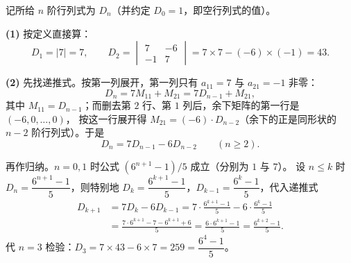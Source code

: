 
\begin{solution}
记所给 $n$ 阶行列式为 $D_n$（并约定 $D_0=1$，即空行列式的值）。

\textbf{(1)} 按定义直接算：
\[
D_1=|7|=7,\qquad
D_2=\begin{vmatrix}7&-6\\-1&7\end{vmatrix}=7\times7-(-6)\times(-1)=43 .
\]

\textbf{(2)} 先找递推式。按第一列展开，第一列只有 $a_{11}=7$ 与 $a_{21}=-1$ 非零：
\[
D_n=7M_{11}+M_{21}=7D_{n-1}+M_{21},
\]
其中 $M_{11}=D_{n-1}$；而删去第 $2$ 行、第 $1$ 列后，余下矩阵的第一行是 $(-6,0,\dots,0)$，
按这一行展开得 $M_{21}=(-6)\cdot D_{n-2}$（余下的正是同形状的 $n-2$ 阶行列式）。于是
\[
D_n=7D_{n-1}-6D_{n-2}\qquad(n\ge2).
\]

再作归纳。$n=0,1$ 时公式 $(6^{n+1}-1)/5$ 成立（分别为 $1$ 与 $7$）。
设 $n\le k$ 时 $D_n=\dfrac{6^{n+1}-1}{5}$，则特别地 $D_k=\dfrac{6^{k+1}-1}{5}$，$D_{k-1}=\dfrac{6^{k}-1}{5}$，代入递推式
\[
\begin{aligned}
D_{k+1}&=7D_k-6D_{k-1}
=7\cdot\frac{6^{k+1}-1}{5}-6\cdot\frac{6^{k}-1}{5}\\
&=\frac{7\cdot6^{k+1}-7-6^{k+1}+6}{5}
=\frac{6\cdot6^{k+1}-1}{5}
=\frac{6^{k+2}-1}{5}.
\end{aligned}
\]
代 $n=3$ 检验：$D_3=7\times43-6\times7=259=\dfrac{6^{4}-1}{5}$。
\end{solution}

